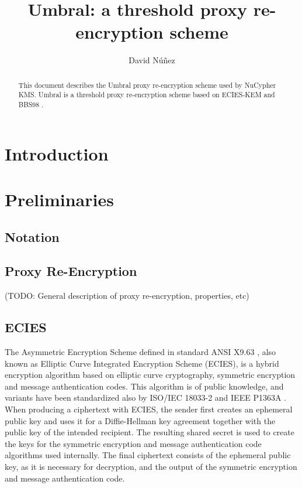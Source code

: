\documentclass[12pt]{article}
\title{Umbral: a threshold proxy re-encryption scheme}
\author{David Núñez}
\date{} %
\begin{document}
\maketitle

\begin{abstract}
This document describes the Umbral proxy re-encryption scheme used by NuCypher KMS. 
Umbral is a threshold proxy re-encryption scheme based on ECIES-KEM \cite{ecies-iso} and BBS98 \cite{blaze1998divertible}. 


\end{abstract}



\section{Introduction}

\section{Preliminaries}

\subsection{Notation}

\subsection{Proxy Re-Encryption}

(TODO: General description of proxy re-encryption, properties, etc)

\subsection{ECIES}

The Asymmetric Encryption Scheme defined in standard ANSI X9.63 \cite{ansi-x9.63}, also known as Elliptic Curve Integrated Encryption Scheme (ECIES), is a hybrid encryption algorithm based on elliptic curve cryptography, symmetric encryption and message authentication codes. 
This algorithm is of public knowledge, and variants have been standardized also by ISO/IEC 18033-2 \cite{iso-18033-2} and IEEE P1363A \cite{ieee-p1363a}.  
When producing a ciphertext with ECIES, the sender first creates an ephemeral public key and uses it for a Diffie-Hellman key agreement together with the public key of the intended recipient. The resulting shared secret is used to create the keys for the symmetric encryption and message authentication code algorithms used internally. The final ciphertext consists of the ephemeral public key, as it is necessary for decryption, and the output of the symmetric encryption and message authentication code.
\end{document}
